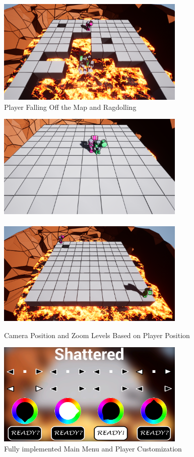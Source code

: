 \documentclass[conference,compsoc]{IEEEtran}
\begin{document}
\begin{figure}[t]
  \centering
  \includegraphics[width=0.8\textwidth]{dying.png}%
  \caption{Player Falling Off the Map and Ragdolling}
\end{figure}
\begin{figure}[b]
  \centering
  \includegraphics[width=0.8\textwidth]{zoom1.png}\\~\\
  \includegraphics[width=0.8\textwidth]{zoom2.png}%
  \caption{Camera Position and Zoom Levels Based on Player Position}
\end{figure}
\begin{figure}[b]
  \centering
  \includegraphics[width=0.8\textwidth]{mainmenu.png}%
  \caption{Fully implemented Main Menu and Player Customization}
\end{figure}
\end{document}

